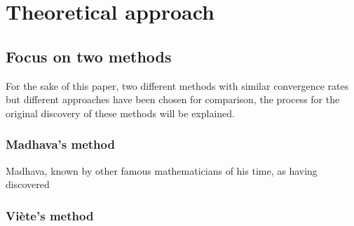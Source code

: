 \section{Theoretical approach}

\subsection{Focus on two methods}

For the sake of this paper, two different methods with similar 
convergence rates but different approaches have been chosen for 
comparison, the process for the original discovery of these methods
will be explained.


\subsubsection{Madhava's method}

Madhava, known by other famous mathematicians of his time, as having 
discovered 


\subsubsection{Viète's method}